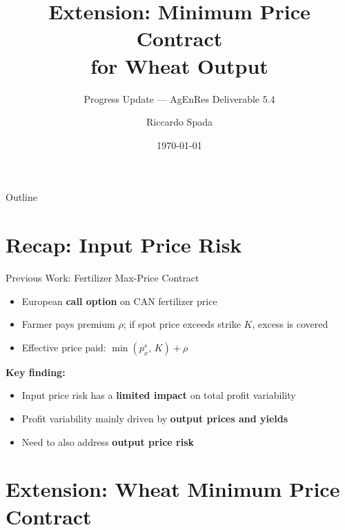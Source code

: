 \documentclass[aspectratio=169,12pt]{beamer}
\title[Wheat Minimum Price Contract]{Extension: Minimum Price Contract \\for Wheat Output}
\subtitle{Progress Update --- AgEnRes Deliverable 5.4}
\author{Riccardo Spada}
\institute{Business Economics Group \\ Wageningen University \& Research}
\date{\today}
\begin{document}
\begin{frame}
\titlepage
\end{frame}

\begin{frame}{Outline}
\tableofcontents
\end{frame}

\section{Recap: Input Price Risk}

\begin{frame}{Previous Work: Fertilizer Max-Price Contract}
\begin{itemize}
    \item European \textbf{call option} on CAN fertilizer price
    \item Farmer pays premium $\rho$; if spot price exceeds strike $K$, excess is covered
    \item Effective price paid: $\min(p_x^s,\, K) + \rho$
\end{itemize}

\vspace{0.5em}
\textbf{Key finding:}
\begin{itemize}
    \item Input price risk has a \textbf{limited impact} on total profit variability
    \item Profit variability mainly driven by \textbf{output prices and yields}
    \item[$\rightarrow$] Need to also address \textbf{output price risk}
\end{itemize}
\end{frame}

\section{Extension: Wheat Minimum Price Contract}
\end{document}
